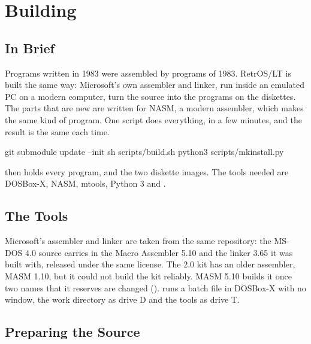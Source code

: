 \mwnewpart
\renewcommand\runningtitle{Section 2. Building}
\chapter{Building}
\sectioncontents

\section{In Brief}

\begin{plainwords}
Programs written in 1983 were assembled by programs of 1983. RetrOS/LT is
built the same way: Microsoft's own assembler and linker, run inside an
emulated PC on a modern computer, turn the source into the programs on
the diskettes. The parts that are new are written for NASM, a modern
assembler, which makes the same kind of program. One script does
everything, in a few minutes, and the result is the same each time.
\end{plainwords}

\begin{dialogue}
git submodule update --init
sh scripts/build.sh
python3 scripts/mkinstall.py
\end{dialogue}

 then holds every program, and 
the two diskette images. The tools needed are DOSBox-X, NASM, mtools,
Python 3 and .

\section{The Tools}

Microsoft's assembler and linker are taken from the same repository: the
MS-DOS 4.0 source carries in  the Macro Assembler
5.10 and the linker 3.65 it was built with, released under the same
license. The 2.0 kit has an older assembler, MASM 1.10, but it could not
build the kit reliably. MASM 5.10 builds it once two names that it
reserves are changed ().  runs a batch
file in DOSBox-X with no window, the work directory as drive D and the
tools as drive T.

\section{Preparing the Source}


